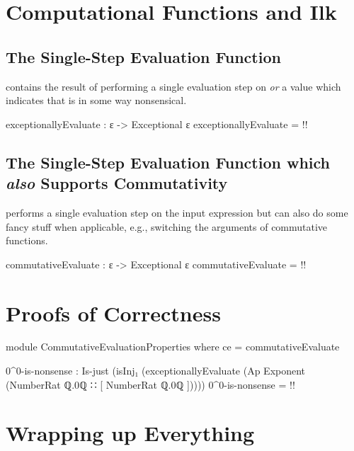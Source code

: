 \documentclass{report}
\begin{document}
\chapter{Computational Functions and Ilk}

\section{The Single-Step Evaluation Function}
  contains the result of performing a single evaluation step on  \emph{or} a value which indicates that  is in some way nonsensical.

\begin{code}
exceptionallyEvaluate : ε -> Exceptional ε
exceptionallyEvaluate = {!!}
\end{code}

\section{The Single-Step Evaluation Function which \emph{also} Supports Commutativity}
  performs a single evaluation step on the input expression but can also do some fancy stuff when applicable, e.g., switching the arguments of commutative functions.

\begin{code}
commutativeEvaluate : ε -> Exceptional ε
commutativeEvaluate = {!!}
\end{code}

\chapter{Proofs of Correctness}

\begin{code}
module CommutativeEvaluationProperties where
  ce = commutativeEvaluate

  0^0-is-nonsense :
    Is-just (isInj₁ (exceptionallyEvaluate
      (Ap Exponent (NumberRat ℚ.0ℚ ∷ [ NumberRat ℚ.0ℚ ]))))
  0^0-is-nonsense = {!!}
\end{code}

\chapter{Wrapping up Everything}
\end{document}

